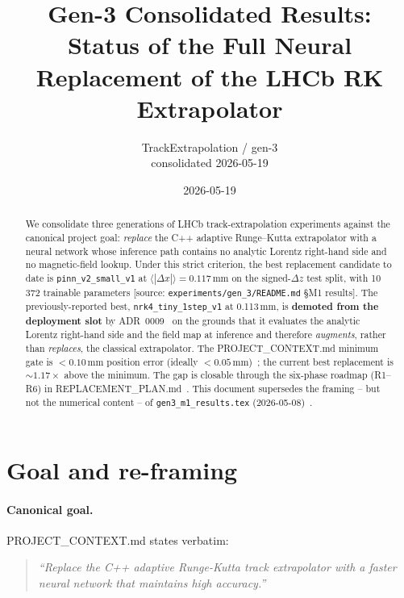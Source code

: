 \documentclass[11pt,a4paper]{article}
\title{Gen-3 Consolidated Results:\\
       Status of the Full Neural Replacement of the LHCb RK Extrapolator}
\author{TrackExtrapolation / gen-3 \\ \small consolidated 2026-05-19}
\date{2026-05-19}
\begin{document}
\maketitle

\begin{abstract}
We consolidate three generations of LHCb track-extrapolation experiments
against the canonical project goal: \emph{replace} the C++ adaptive
Runge--Kutta extrapolator with a neural network whose inference path
contains no analytic Lorentz right-hand side and no magnetic-field
lookup. Under this strict criterion, the best replacement candidate to
date is \texttt{pinn\_v2\_small\_v1} at $\langle|\Delta x|\rangle =
0.117$\,mm on the signed-$\Delta z$ test split, with 10\,372 trainable
parameters
[source: \texttt{experiments/gen\_3/README.md} \S M1 results].
The previously-reported best, \texttt{nrk4\_tiny\_1step\_v1} at
0.113\,mm, is \textbf{demoted from the deployment slot} by
ADR~0009~\cite{adr0009} on the grounds that it evaluates the analytic
Lorentz right-hand side and the field map at inference and therefore
\emph{augments}, rather than \emph{replaces}, the classical
extrapolator. The PROJECT\_CONTEXT.md minimum gate is $<0.10$\,mm
position error (ideally $<0.05$\,mm)~\cite{projectcontext}; the current
best replacement is $\sim 1.17\times$ above the minimum. The gap is
closable through the six-phase roadmap (R1--R6) in
REPLACEMENT\_PLAN.md~\cite{replacementplan}. This document supersedes
the framing -- but not the numerical content -- of
\texttt{gen3\_m1\_results.tex} (2026-05-08)~\cite{gen3m1}.
\end{abstract}

\section{Goal and re-framing}\label{sec:goal}

\paragraph{Canonical goal.} PROJECT\_CONTEXT.md states verbatim:

\begin{quote}\itshape
``Replace the C++ adaptive Runge-Kutta track extrapolator with a faster
neural network that maintains high accuracy.''
\hfill\cite{projectcontext}
\end{quote}
\end{document}
